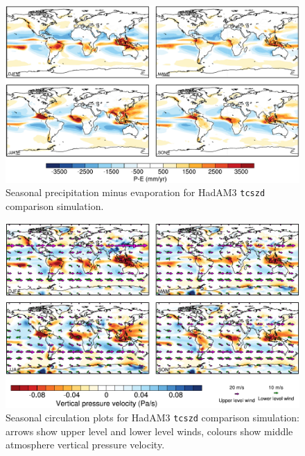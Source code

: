 \documentclass[a4paper,11pt]{article}
\begin{document}
\begin{figure}
  \begin{center}
    \includegraphics[width=\textwidth]{../hadam3-comparison/plots/pmine-plots}
  \end{center}
  \caption{Seasonal precipitation minus evaporation for HadAM3
    \texttt{tcszd} comparison simulation.}
  \label{fig:pmine-hadam3}
\end{figure}

\begin{figure}
  \begin{center}
    \includegraphics[width=\textwidth]{../hadam3-comparison/plots/wind-plots}
  \end{center}
  \caption{Seasonal circulation plots for HadAM3 \texttt{tcszd}
    comparison simulation: arrows show upper level and lower level
    winds, colours show middle atmosphere vertical pressure velocity.}
  \label{fig:wind-hadam3}
\end{figure}
\end{document}
